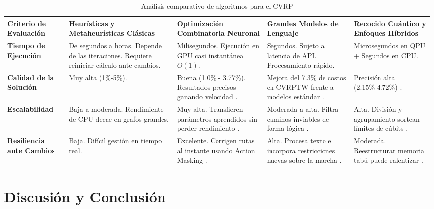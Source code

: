 \documentclass[a4paper, 11pt]{article}
\begin{document}
\begin{table}[ht]
\caption{Análisis comparativo de algoritmos para el CVRP}
\label{tab:comparative}
\centering
\footnotesize 
\begin{tabularx}{\textwidth}{@{} >{\raggedright\arraybackslash}p{2.5cm} >{\raggedright\arraybackslash}X >{\raggedright\arraybackslash}X >{\raggedright\arraybackslash}X >{\raggedright\arraybackslash}X @{}}
\toprule
\textbf{Criterio de Evaluación} & \textbf{Heurísticas y Metaheurísticas Clásicas} & \textbf{Optimización Combinatoria Neuronal} & \textbf{Grandes Modelos de Lenguaje} & \textbf{Recocido Cuántico y Enfoques Híbridos} \\ \midrule
\textbf{Tiempo de Ejecución} & De segundos a horas. Depende de las iteraciones. Requiere reiniciar cálculo ante cambios. & Milisegundos. Ejecución en GPU casi instantánea $O(1)$. & Segundos. Sujeto a latencia de API. Procesamiento rápido. & Microsegundos en QPU + Segundos en CPU. \\ \addlinespace
\textbf{Calidad de la Solución} & Muy alta (1\%-5\%). & Buena (1.0\% - 3.77\%). Resultados precisos ganando velocidad \cite{ref5}. & Mejora del 7.3\% de costos en CVRPTW frente a modelos estándar \cite{ref11}. & Precisión alta (2.15\%-4.72\%) \cite{ref12}. \\ \addlinespace
\textbf{Escalabilidad} & Baja a moderada. Rendimiento de CPU decae en grafos grandes. & Muy alta. Transfieren parámetros aprendidos sin perder rendimiento \cite{ref1}. & Moderada a alta. Filtra caminos inviables de forma lógica \cite{ref9}. & Alta. División y agrupamiento sortean límites de cúbits \cite{ref14}. \\ \addlinespace
\textbf{Resiliencia ante Cambios} & Baja. Difícil gestión en tiempo real. & Excelente. Corrigen rutas al instante usando Action Masking \cite{ref2}. & Alta. Procesa texto e incorpora restricciones nuevas sobre la marcha \cite{ref4}. & Moderada. Reestructurar memoria tabú puede ralentizar \cite{ref13}. \\ \bottomrule
\end{tabularx}
\end{table}

\section{Discusión y Conclusión}
\end{document}
